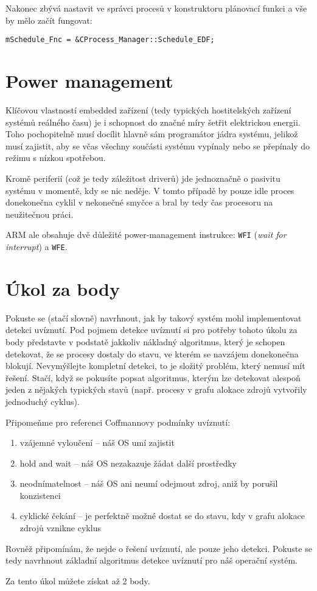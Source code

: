\documentclass{article}
\begin{document}
Nakonec zbývá nastavit ve správci procesů v konstruktoru plánovací funkci a vše by mělo začít fungovat:
\begin{lstlisting}
mSchedule_Fnc = &CProcess_Manager::Schedule_EDF;
\end{lstlisting}


\section{Power management}

Klíčovou vlastností embedded zařízení (tedy typických hostitelských zařízení systémů reálného času) je i schopnost do značné míry šetřit elektrickou energii. Toho pochopitelně musí docílit hlavně sám programátor jádra systému, jelikož musí zajistit, aby se včas všechny součásti systému vypínaly nebo se přepínaly do režimu s nízkou spotřebou.

Kromě periferií (což je tedy záležitost driverů) jde jednoznačně o pasivitu systému v momentě, kdy se nic neděje. V tomto případě by pouze idle proces donekonečna cyklil v nekonečné smyčce a bral by tedy čas procesoru na neužitečnou práci.

ARM ale obsahuje dvě důležité power-management instrukce: \texttt{WFI} (\emph{wait for interrupt}) a \texttt{WFE}.  


\section{Úkol za body}

Pokuste se (stačí slovně) navrhnout, jak by takový systém mohl implementovat detekci uvíznutí. Pod pojmem detekce uvíznutí si pro potřeby tohoto úkolu za body představte v podstatě jakkoliv nákladný algoritmus, který je schopen detekovat, že se procesy dostaly do stavu, ve kterém se navzájem donekonečna blokují. Nevymýšlejte kompletní detekci, to je složitý problém, který nemusí mít řešení. Stačí, když se pokusíte popsat algoritmus, kterým lze detekovat alespoň jeden z nějakých typických stavů (např. procesy v grafu alokace zdrojů vytvořily jednoduchý cyklus).

Připomeňme pro referenci Coffmannovy podmínky uvíznutí:
\begin{enumerate}
	\item vzájemné vyloučení -- náš OS umí zajistit
	\item hold and wait -- náš OS nezakazuje žádat další prostředky
	\item neodnímatelnost -- náš OS ani neumí odejmout zdroj, aniž by porušil konzistenci
	\item cyklické čekání -- je perfektně možné dostat se do stavu, kdy v grafu alokace zdrojů vznikne cyklus
\end{enumerate}

Rovněž připomínám, že nejde o řešení uvíznutí, ale pouze jeho detekci. Pokuste se tedy navrhnout základní algoritmus detekce uvíznutí pro náš operační systém.

Za tento úkol můžete získat až 2 body.
\end{document}
